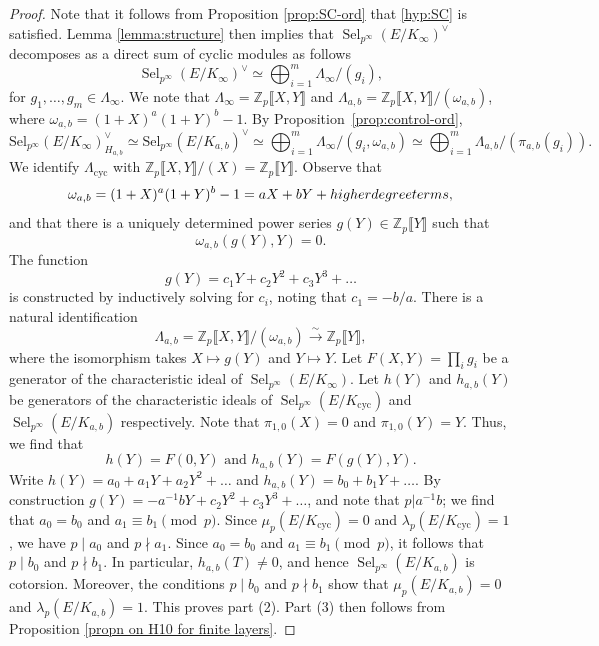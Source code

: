 \documentclass[12pt]{amsart}
\newcommand{\Z}{\mathbb{Z}}
\newcommand{\Sel}{\mathrm{Sel}}
\newcommand{\op}[1]{\operatorname{#1}}
\numberwithin{equation}{section}
\begin{document}
\begin{proof}
   Note that it follows from Proposition \ref{prop:SC-ord} that \eqref{hyp:SC} is satisfied. Lemma \ref{lemma:structure} then implies that $\op{Sel}_{p^\infty}(E/K_\infty)^\vee$ decomposes as a direct sum of cyclic modules as follows
\[
\op{Sel}_{p^\infty}(E/K_\infty)^\vee\simeq \bigoplus_{i=1}^m \Lambda_\infty/(g_i),
\]
for $g_1, \dots, g_m \in \Lambda_\infty$. We note that $\Lambda_\infty=\Z_p\llbracket X, Y\rrbracket$ and $\Lambda_{a,b}=\Z_p\llbracket X, Y\rrbracket/(\omega_{a,b})$, where
$\omega_{a,b}=(1+X)^a(1+Y)^b-1$. By Proposition~\ref{prop:control-ord},
\[
\Sel_{p^\infty}(E/K_\infty)^\vee_{H_{a,b}}\simeq \Sel_{p^\infty}(E/K_{a,b})^\vee\simeq \bigoplus_{i=1}^m \Lambda_\infty/(g_i,\omega_{a,b})\simeq \bigoplus_{i=1}^m \Lambda_{a,b}/(\pi_{a,b}(g_i)).
\]
We identify $\Lambda_{\op{cyc}}$ with $\Z_p\llbracket X, Y\rrbracket/(X)=\Z_p\llbracket Y\rrbracket$. Observe that
\[\omega_{a,b}=(1+X)^a(1+Y)^b-1=aX+bY+\emph{higher degree terms},\] and that there is a uniquely determined power series $g(Y)\in \Z_p\llbracket Y\rrbracket$ such that 
\[\omega_{a,b}(g(Y), Y)=0.\]
The function \[g(Y)=c_1 Y+c_2 Y^2+c_3 Y^3+\dots \] is constructed by inductively solving for $c_i$, noting that $c_1=-b/a$. There is a natural identification
\[\Lambda_{a,b}=\Z_p\llbracket X,Y\rrbracket/(\omega_{a,b})\xrightarrow{\sim} \Z_p\llbracket Y\rrbracket,\] where the isomorphism takes $X\mapsto g(Y)$ and $Y\mapsto Y$. Let $F(X,Y)=\prod_i g_i$ be a generator of the characteristic ideal of $\op{Sel}_{p^\infty}(E/K_\infty)$. Let $h(Y)$ and $h_{a, b}(Y)$ be generators of the characteristic ideals of $\op{Sel}_{p^\infty}(E/K_{\op{cyc}})$ and $\op{Sel}_{p^\infty}(E/K_{a,b})$ respectively. Note that $\pi_{1,0}(X)=0$ and $\pi_{1,0}(Y)=Y$. Thus, we find that 
\[
    h(Y)=F(0,Y)\text{ and } h_{a,b}(Y)=F(g(Y), Y).\]
    Write $h(Y)=a_0+a_1 Y+a_2Y^2+\dots$ and $h_{a,b}(Y)=b_0+b_1 Y+\dots$. By construction $g(Y)=-a^{-1}b Y+c_2 Y^2+c_3Y^3+\dots$, and note that $p|a^{-1}b$; we find that $a_0=b_0$ and $a_1\equiv b_1\pmod{p}$. Since $\mu_p(E/K_{\op{cyc}})=0$ and $\lambda_p(E/K_{\op{cyc}})=1$, we have $p\mid a_0$ and $p\nmid a_1$. Since $a_0=b_0$ and $a_1\equiv b_1\pmod p$, it follows that $p\mid b_0$ and $p\nmid b_1$. In particular, $h_{a,b}(T)\neq 0$, and hence $\op{Sel}_{p^\infty}(E/K_{a,b})$ is cotorsion. Moreover, the conditions $p\mid b_0$ and $p\nmid b_1$ show that $\mu_p(E/K_{a,b})=0$ and $\lambda_p(E/K_{a,b})=1$. This proves part (2). Part (3) then follows from Proposition \ref{propn on H10 for finite layers}.
\end{proof}
\end{document}
